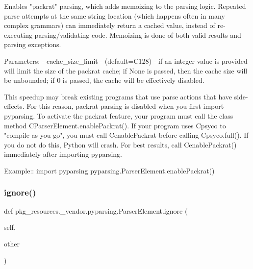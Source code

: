 \begin{DoxyVerb}Enables "packrat" parsing, which adds memoizing to the parsing logic.
   Repeated parse attempts at the same string location (which happens
   often in many complex grammars) can immediately return a cached value,
   instead of re-executing parsing/validating code.  Memoizing is done of
   both valid results and parsing exceptions.
   
   Parameters:
    - cache_size_limit - (default=C{128}) - if an integer value is provided
      will limit the size of the packrat cache; if None is passed, then
      the cache size will be unbounded; if 0 is passed, the cache will
      be effectively disabled.
    
   This speedup may break existing programs that use parse actions that
   have side-effects.  For this reason, packrat parsing is disabled when
   you first import pyparsing.  To activate the packrat feature, your
   program must call the class method C{ParserElement.enablePackrat()}.  If
   your program uses C{psyco} to "compile as you go", you must call
   C{enablePackrat} before calling C{psyco.full()}.  If you do not do this,
   Python will crash.  For best results, call C{enablePackrat()} immediately
   after importing pyparsing.
   
   Example::
       import pyparsing
       pyparsing.ParserElement.enablePackrat()
\end{DoxyVerb}
 \mbox{\label{classpkg__resources_1_1__vendor_1_1pyparsing_1_1_parser_element_ac2708a9557b2c3724ceb052e45ef8903}} 
\subsubsection{\texorpdfstring{ignore()}{ignore()}}
{\footnotesize\ttfamily def pkg\+\_\+resources.\+\_\+vendor.\+pyparsing.\+Parser\+Element.\+ignore (\begin{DoxyParamCaption}\item[{}]{self,  }\item[{}]{other }\end{DoxyParamCaption})}

